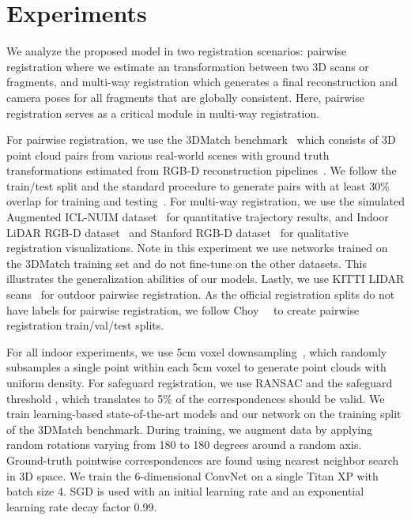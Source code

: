 \documentclass[10pt,twocolumn,letterpaper]{article}
\begin{document}
 \section{Experiments}
\label{sec:experiment}

We analyze the proposed model in two registration scenarios: pairwise registration where we estimate an  transformation between two 3D scans or fragments, and multi-way registration which generates a final reconstruction and camera poses for all fragments that are globally consistent. Here, pairwise registration serves as a critical module in multi-way registration.

For pairwise registration, we use the 3DMatch benchmark~\cite{zeng20163dmatch} which consists of 3D point cloud pairs from various real-world scenes with ground truth transformations estimated from RGB-D reconstruction pipelines~\cite{HalberF2C17,dai2017bundlefusion}.
We follow the train/test split and the standard procedure to generate pairs with at least 30\% overlap for training and testing~\cite{ppf,ppf_fold,FCGF2019}.
For multi-way registration, we use the simulated Augmented ICL-NUIM dataset~\cite{choi2015cvpr,ahanda2014icra} for quantitative trajectory results, and Indoor LiDAR RGB-D dataset~\cite{Park2017} and Stanford RGB-D dataset~\cite{choi2015cvpr} for qualitative registration visualizations. Note in this experiment we use networks trained on the 3DMatch training set and do not fine-tune on the other datasets. This illustrates the generalization abilities of our models.
Lastly, we use KITTI LIDAR scans~\cite{kitti} for outdoor pairwise registration. As the official registration splits do not have labels for pairwise registration, we follow Choy~\etal~\cite{FCGF2019} to create pairwise registration train/val/test splits.

For all indoor experiments, we use 5cm voxel downsampling~\cite{rusu2009icra,Zhou2018}, which randomly subsamples a single point within each 5cm voxel to generate point clouds with uniform density. For safeguard registration, we use RANSAC and the safeguard threshold , which translates to 5\% of the correspondences should be valid.
We train learning-based state-of-the-art models and our network on the training split of the 3DMatch benchmark. During training, we augment data by applying random rotations varying from 180 to 180 degrees around a random axis. Ground-truth pointwise correspondences are found using nearest neighbor search in 3D space.
We train the 6-dimensional ConvNet on a single Titan XP with batch size 4. SGD is used with an initial learning rate  and an exponential learning rate decay factor 0.99. 
\end{document}
